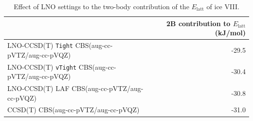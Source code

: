 \begin{table}[h]

\caption{\label{tab:lno_effect}Effect of LNO settings to the two-body contribution of the $E_\text{latt}$ of ice VIII.}
\begin{tabular}{lr}
\toprule
 & 2B contribution to $E_\text{latt}$ (kJ/mol) \\ 
\midrule
LNO-CCSD(T) {\tt Tight} CBS(aug-cc-pVTZ/aug-cc-pVQZ) & -29.5 \\
LNO-CCSD(T) {\tt vTight} CBS(aug-cc-pVTZ/aug-cc-pVQZ) & -30.4 \\
LNO-CCSD(T) LAF CBS(aug-cc-pVTZ/aug-cc-pVQZ) & -30.8 \\
CCSD(T) CBS(aug-cc-pVTZ/aug-cc-pVQZ) & -31.0 \\
\bottomrule
\end{tabular}

\end{table}